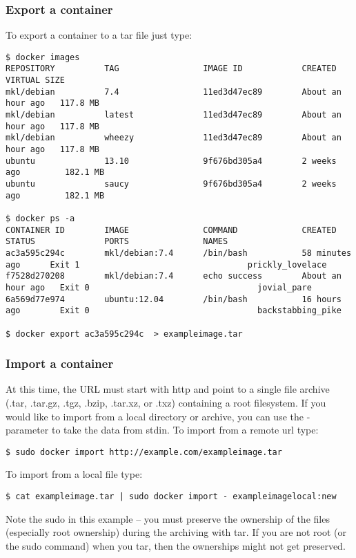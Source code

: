 \documentclass[11pt]{article}
\begin{document}
\subsubsection{Export a container}
\label{sec-2-3-11}

To export a container to a tar file just type:

\begin{verbatim}
$ docker images
REPOSITORY          TAG                 IMAGE ID            CREATED             VIRTUAL SIZE
mkl/debian          7.4                 11ed3d47ec89        About an hour ago   117.8 MB
mkl/debian          latest              11ed3d47ec89        About an hour ago   117.8 MB
mkl/debian          wheezy              11ed3d47ec89        About an hour ago   117.8 MB
ubuntu              13.10               9f676bd305a4        2 weeks ago         182.1 MB
ubuntu              saucy               9f676bd305a4        2 weeks ago         182.1 MB

$ docker ps -a
CONTAINER ID        IMAGE               COMMAND             CREATED             STATUS              PORTS               NAMES
ac3a595c294c        mkl/debian:7.4      /bin/bash           58 minutes ago      Exit 1                                  prickly_lovelace    
f7528d270208        mkl/debian:7.4      echo success        About an hour ago   Exit 0                                  jovial_pare         
6a569d77e974        ubuntu:12.04        /bin/bash           16 hours ago        Exit 0                                  backstabbing_pike 

$ docker export ac3a595c294c  > exampleimage.tar
\end{verbatim}
\subsubsection{Import a container}
\label{sec-2-3-12}

At this time, the URL must start with http and point to a single file archive (.tar, .tar.gz, .tgz, .bzip, .tar.xz, or .txz) containing a root filesystem. If you would like to import from a local directory or archive, you can use the - parameter to take the data from stdin.
To import from a remote url type:

\begin{verbatim}
$ sudo docker import http://example.com/exampleimage.tar
\end{verbatim}
To import from a local file type:

\begin{verbatim}
$ cat exampleimage.tar | sudo docker import - exampleimagelocal:new
\end{verbatim}
Note the sudo in this example – you must preserve the ownership of the files (especially root ownership) during the archiving with tar. If you are not root (or the sudo command) when you tar, then the ownerships might not get preserved.
\end{document}
